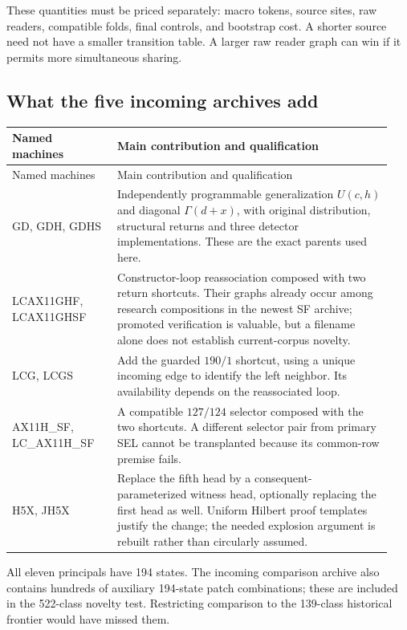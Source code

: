 \documentclass[11pt,letterpaper]{article}
\begin{document}
These quantities must be priced separately: macro tokens, source sites,
raw readers, compatible folds, final controls, and bootstrap cost. A
shorter source need not have a smaller transition table. A larger raw
reader graph can win if it permits more simultaneous sharing.

\subsection{What the five incoming archives add}

\begin{longtable}{@{}>{\raggedright\arraybackslash}p{0.26\linewidth}>{\raggedright\arraybackslash}p{0.68\linewidth}@{}}
\toprule Named machines & Main contribution and qualification\\\midrule\endfirsthead
\toprule Named machines & Main contribution and qualification\\\midrule\endhead
GD, GDH, GDHS & Independently programmable generalization $U(c,h)$ and diagonal $\Gamma(d+x)$, with original distribution, structural returns and three detector implementations. These are the exact parents used here.\\[4pt]
LCAX11GHF, LCAX11GHSF & Constructor-loop reassociation composed with two return shortcuts. Their graphs already occur among research compositions in the newest SF archive; promoted verification is valuable, but a filename alone does not establish current-corpus novelty.\\[4pt]
LCG, LCGS & Add the guarded $190/1$ shortcut, using a unique incoming edge to identify the left neighbor. Its availability depends on the reassociated loop.\\[4pt]
AX11H\_SF, LC\_AX11H\_SF & A compatible $127/124$ selector composed with the two shortcuts. A different selector pair from primary SEL cannot be transplanted because its common-row premise fails.\\[4pt]
H5X, JH5X & Replace the fifth head by a consequent-parameterized witness head, optionally replacing the first head as well. Uniform Hilbert proof templates justify the change; the needed explosion argument is rebuilt rather than circularly assumed.\\
\bottomrule
\end{longtable}

All eleven principals have 194 states. The incoming comparison archive
also contains hundreds of auxiliary 194-state patch combinations; these
are included in the 522-class novelty test. Restricting comparison to
the 139-class historical frontier would have missed them.
\end{document}
